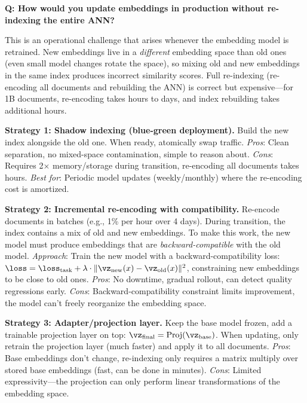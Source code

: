 \begin{interviewq}
\textbf{Q: How would you update embeddings in production without re-indexing the entire ANN?}

 \quad {} \quad \badgefreq{\freqlow}

\stronganswer

This is an operational challenge that arises whenever the embedding model is retrained. New embeddings live in a \textit{different} embedding space than old ones (even small model changes rotate the space), so mixing old and new embeddings in the same index produces incorrect similarity scores. Full re-indexing (re-encoding all documents and rebuilding the ANN) is correct but expensive---for 1B documents, re-encoding takes hours to days, and index rebuilding takes additional hours.

\textbf{Strategy 1: Shadow indexing (blue-green deployment).} Build the new index alongside the old one. When ready, atomically swap traffic. \textit{Pros}: Clean separation, no mixed-space contamination, simple to reason about. \textit{Cons}: Requires 2$\times$ memory/storage during transition, re-encoding all documents takes hours. \textit{Best for}: Periodic model updates (weekly/monthly) where the re-encoding cost is amortized.

\textbf{Strategy 2: Incremental re-encoding with compatibility.} Re-encode documents in batches (e.g., 1\% per hour over 4 days). During transition, the index contains a mix of old and new embeddings. To make this work, the new model must produce embeddings that are \textit{backward-compatible} with the old model. \textit{Approach}: Train the new model with a backward-compatibility loss: $\loss = \loss_{\text{task}} + \lambda \cdot \|\vz_{\text{new}}(x) - \vz_{\text{old}}(x)\|^2$, constraining new embeddings to be close to old ones. \textit{Pros}: No downtime, gradual rollout, can detect quality regressions early. \textit{Cons}: Backward-compatibility constraint limits improvement, the model can't freely reorganize the embedding space.

\textbf{Strategy 3: Adapter/projection layer.} Keep the base model frozen, add a trainable projection layer on top: $\vz_{\text{final}} = \text{Proj}(\vz_{\text{base}})$. When updating, only retrain the projection layer (much faster) and apply it to all documents. \textit{Pros}: Base embeddings don't change, re-indexing only requires a matrix multiply over stored base embeddings (fast, can be done in minutes). \textit{Cons}: Limited expressivity---the projection can only perform linear transformations of the embedding space.


\end{interviewq}
